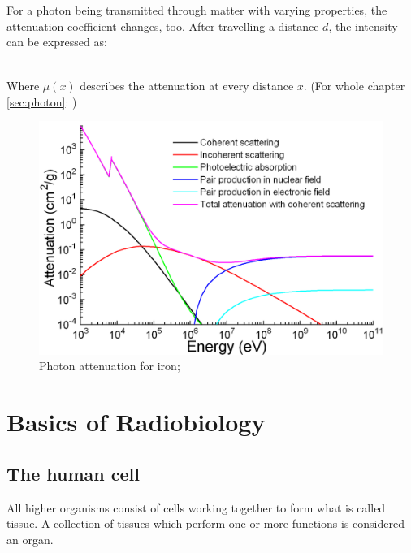 For a photon being transmitted through matter with varying properties, the attenuation coefficient changes, too.
After travelling a distance $d$, the intensity can be expressed as:

\begin{align}
\label{eq:mu_int}
\end{align}

Where $\mu(x)$ describes the attenuation at every distance $x$.
(For whole chapter \ref{sec:photon}: \cite{Podgorsak, Maidment2014})

\begin{figure}[h!]
	\centering
	\includegraphics[width=0.7\linewidth]{../fig/intro/Ironattenuation}
	\caption{Photon attenuation for iron; \cite{Materialscientist}}
	\label{fig:attenuation_iron}
\end{figure}

\section{Basics of Radiobiology}
\label{sec:cell}
\subsection{The human cell}
All higher organisms consist of cells working together to form what is called tissue.
A collection of tissues which perform one or more functions is considered an organ. \\

